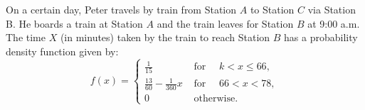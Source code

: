 \documentclass[letterpaper,10pt,addpoints]{exam}
\begin{document}


\newpage
\begin{questions}

\question[40]
On a certain day, Peter travels by train from Station $A$ to Station $C$ via Station B. He boards a train at Station $A$ and the train leaves for Station $B$ at 9:00 a.m. The time $X$ (in minutes) taken by the train to reach Station $B$ has a probability density function given by:
$$
f(x)= \begin{cases}\frac{1}{15} & \text { for } \quad k<x \leq 66, \\ \frac{13}{60}-\frac{1}{360} x & \text { for } \quad 66<x<78, \\ 0 & \text { otherwise. }\end{cases}
$$
\begin{parts}

\end{parts}
\end{questions}
\end{document}
